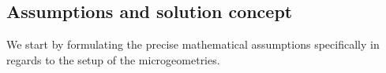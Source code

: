 \documentclass[reqno, 11pt]{amsart}
\numberwithin{equation}{section}
\newcommand{\AM}[1]{{\color{brown}#1}}
\newcommand{\ee}{{\mathrm{e}}}
\def\be{\begin{equation}}
\def\ee{\end{equation}}
\begin{document}



\subsection{Assumptions and solution concept}
We start by formulating the precise mathematical assumptions specifically in regards to the setup of the microgeometries.
\end{document}
